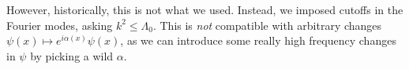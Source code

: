 \documentclass[a4paper]{article}
\begin{document}
However, historically, this is not what we used. Instead, we imposed cutoffs in the Fourier modes, asking $k^2 \leq \Lambda_0$. This is \emph{not} compatible with arbitrary changes $\psi(x) \mapsto e^{i\alpha(x)} \psi(x)$, as we can introduce some really high frequency changes in $\psi$ by picking a wild $\alpha$.


%
%
\end{document}
